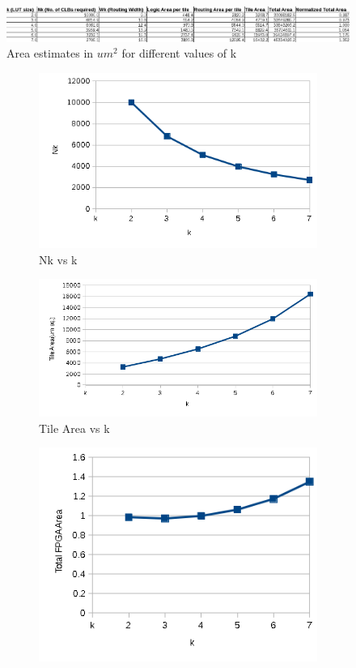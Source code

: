 \begin{figure}[h]
\centering
\includegraphics[width=\linewidth]{area_table.png}
\caption{Area estimates in $um^2$ for different values of k}
\label{fig:Figure}
\end{figure}

\begin{figure}[h]
\begin{subfigure}{0.5\textwidth}
\includegraphics[scale=0.55]{k_vs_Nk.png} 
\caption{Nk vs k}
\label{fig:Figure}
\end{subfigure}
\begin{subfigure}{0.5\textwidth}
\includegraphics[scale=0.55]{k_vs_tileArea.png}
\caption{Tile Area vs k}
\label{fig:Figure}
\end{subfigure}
 \begin{subfigure}{\textwidth}
\centering
\includegraphics[scale=0.65]{k_vs_totalArea.png}

\end{subfigure}
\end{figure}
